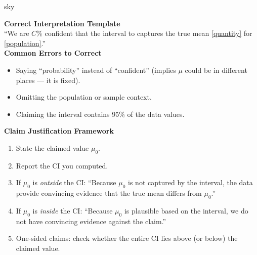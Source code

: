 \documentclass[10pt]{article}
\begin{document}
\begin{skillbox}{sky}
\begin{minipage}[t]{0.48\linewidth}
    \textbf{Correct Interpretation Template}\\
    ``We are $C$\% confident that the interval \blank{2cm} to \blank{2cm}
    captures the true mean \underline{[quantity]} for \underline{[population]}.''\\[6pt]
    \textbf{Common Errors to Correct}
    \begin{itemize}
        \item Saying ``probability'' instead of ``confident'' (implies $\mu$ could
              be in different places --- it is fixed).
        \item Omitting the population or sample context.
        \item Claiming the interval contains 95\% of the data values.
    \end{itemize}
\end{minipage}
\hfill
\begin{minipage}[t]{0.48\linewidth}
    \textbf{Claim Justification Framework}
    \begin{enumerate}
        \item State the claimed value $\mu_0$.
        \item Report the CI you computed.
        \item If $\mu_0$ is \emph{outside} the CI: ``Because $\mu_0$ is not captured
              by the interval, the data provide convincing evidence that the true mean
              differs from $\mu_0$.''
        \item If $\mu_0$ is \emph{inside} the CI: ``Because $\mu_0$ is plausible
              based on the interval, we do not have convincing evidence against the
              claim.''
        \item One-sided claims: check whether the entire CI lies above (or below)
              the claimed value.
    \end{enumerate}
\end{minipage}
\end{skillbox}
\end{document}
